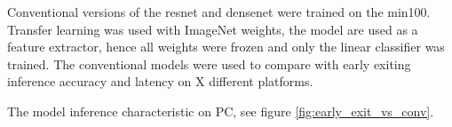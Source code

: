 Conventional versions of the \gls{resnet} and \gls{densenet} were trained on the \gls{min100}. Transfer learning was used with ImageNet weights, the model are used as a feature extractor, hence all weights were frozen and only the linear classifier was trained. The conventional models were used to compare with early exiting inference accuracy and latency on X different platforms.



The model inference characteristic on PC, see figure \ref{fig:early_exit_vs_conv}.

  \begin{figure}
  	\captionsetup[subfigure]{justification=centering}
  	\centering
  	\hfill
	\hfill

\end{figure}
